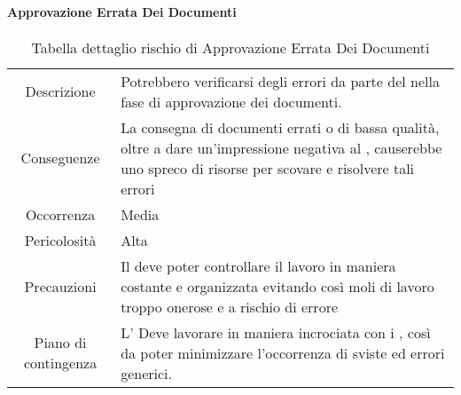 \paragraph*{Approvazione Errata Dei Documenti}
\renewcommand{\arraystretch}{1}
    \begin{table}[H]
        \begin{center}
            \setlength{\aboverulesep}{0pt}
            \setlength{\belowrulesep}{0pt}
            \setlength{\extrarowheight}{.75ex}
            \begin{tabular}{ c p{10cm} }
                \rowcolor{AzzurroGruppo!30} 
                \toprule
                Descrizione & Potrebbero verificarsi degli errori da parte del \RdP{} nella fase di approvazione dei documenti. \\
                Conseguenze & La consegna di documenti errati o di bassa qualità, oltre a dare un'impressione negativa al \proponente{}, causerebbe uno spreco di risorse per scovare e risolvere tali errori \\
                Occorrenza & Media \\
                Pericolosità & Alta \\
                Precauzioni & Il \RdP{} deve poter controllare il lavoro in maniera costante e organizzata evitando così moli di lavoro troppo onerose e a rischio di errore \\
                Piano di contingenza & L'\RdP{} Deve lavorare in maniera incrociata con i \vers{}, così da poter minimizzare l'occorrenza di sviste ed errori generici. \\
                \bottomrule
            \end{tabular}
            \caption{Tabella dettaglio rischio di Approvazione Errata Dei Documenti}
        \end{center}
    \end{table}

